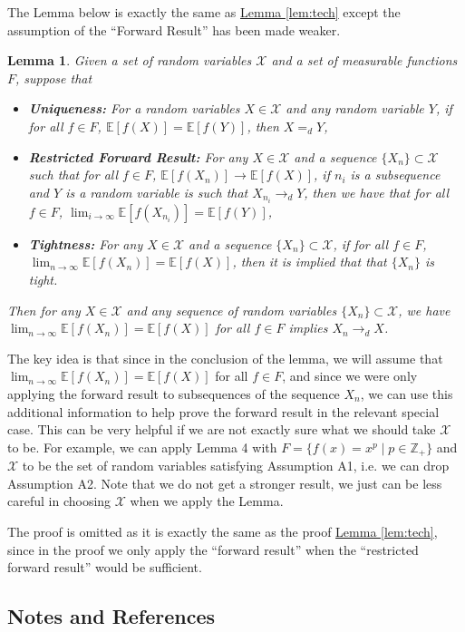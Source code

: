 \documentclass{article}
\newtheorem{lemma}{Lemma}
\theoremstyle{definition}
\newcommand{\E}{\mathbb E}
\newcommand{\1}{\mathbb I}
\newcommand{\Z}{\mathbb Z}
\newcommand{\lemhref}[1]{\hyperref[#1]{Lemma \ref{#1}}}
\begin{document}
The Lemma below is exactly the same as \lemhref{lem:tech} except the assumption of the ``Forward Result'' has been made weaker.
\begin{lemma}
  \label{lem:techHard}
  Given a set of random variables $\mathcal X$ and a set of measurable functions $F$,
  suppose that
  \begin{itemize}
  \item {\bf Uniqueness:} For a random variables $X \in \mathcal X$
    and any random variable $Y$, if for all $f \in F$, $\E[f(X)]
    =\E[f(Y)]$, then $X =_d Y$,
  \item {\bf Restricted Forward Result:} For any $X \in \mathcal X$
    and a sequence $\{X_n\} \subset \mathcal X$ such that for all $f
    \in F$, $\E[f(X_n)] \to \E[f(X)]$, if $n_{i}$ is a subsequence and
    $Y$ is a random variable is such that $X_{n_i} \to_d Y$, then we
    have that for all $f \in F$, $\lim_{i \to \infty} \E[f(X_{n_i})] =
    \E[f(Y)]$,
  \item {\bf Tightness:} For any $X \in \mathcal X$ and a sequence
    $\{X_n\}\subset \mathcal X$, if for all $f \in F$, $\lim_{n \to
      \infty} \E[f(X_n)] = \E[f(X)]$, then it is implied that that
    $\{X_n\}$ is tight.
  \end{itemize}
  Then for any $X \in \mathcal X$ and any sequence of random variables
  $\{X_n\}\subset \mathcal X$, we have $\lim_{n \to \infty} \E[f(X_n)]
  = \E[f(X)]$ for all $f \in F$ implies $X_n \to_d X$.  
\end{lemma}
The key idea is that since in the conclusion of the lemma, we will
assume that $\lim_{n \to \infty} \E[f(X_n)] = \E[f(X)]$ for all $f \in
F$, and since we were only applying the forward result to subsequences
of the sequence $X_n$, we can use this additional information to help
prove the forward result in the relevant special case.  This can be
very helpful if we are not exactly sure what we should take $\mathcal
X$ to be.  For example, we can apply Lemma 4 with $F = \{f(x) = x^p
\mid p \in \Z_+\}$ and $\mathcal X$ to be the set of random variables
satisfying Assumption A1, i.e. we can drop Assumption A2.  Note that
we do not get a stronger result, we just can be less careful in
choosing $\mathcal X$ when we apply the Lemma.

The proof is omitted as it is exactly the same as the proof
\lemhref{lem:tech}, since in the proof we only apply the ``forward
result'' when the ``restricted forward result'' would be sufficient.


\subsection{Notes and References}
\end{document}
